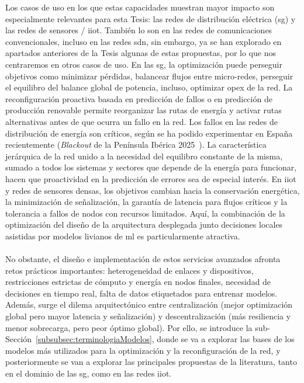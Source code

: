 Los casos de uso en los que estas capacidades muestran mayor impacto son especialmente relevantes para esta Tesis: las redes de distribución eléctrica (\gls{sg}) y las redes de sensores / \gls{iiot}. También lo son en las redes de comunicaciones convencionales, incluso en las redes \gls{sdn}, sin embargo, ya se han explorado en apartados anteriores de la Tesis algunas de estas propuestas, por lo que nos centraremos en otros casos de uso. En las \gls{sg}, la optimización puede perseguir objetivos como minimizar pérdidas, balancear flujos entre micro-redes, perseguir el equilibro del balance global de potencia, incluso, optimizar \gls{opex} de la red. La reconfiguración proactiva basada en predicción de fallos o en predicción de producción renovable permite reorganizar las rutas de energía y activar rutas alternativas antes de que ocurra un fallo en la red. Los fallos en las redes de distribución de energía son críticos, según se ha podido experimentar en España recientemente (\textit{Blackout} de la Península Ibérica 2025~\cite{iberianblackout}). La característica jerárquica de la red unido a la necesidad del equilibro constante de la misma, sumado a todos los sistemas y sectores que depende de la energía para funcionar, hacen que proactividad en la predicción de errores sea de especial interés. En \gls{iiot} y redes de sensores densas, los objetivos cambian hacia la conservación energética, la minimización de señalización, la garantía de latencia para flujos críticos y la tolerancia a fallos de nodos con recursos limitados. Aquí, la combinación de la optimización del diseño de la arquitectura desplegada junto decisiones locales asistidas por modelos livianos de \gls{ml} es particularmente atractiva.\\
\\
No obstante, el diseño e implementación de estos servicios avanzados afronta retos prácticos importantes: heterogeneidad de enlaces y dispositivos, restricciones estrictas de cómputo y energía en nodos finales, necesidad de decisiones en tiempo real, falta de datos etiquetados para entrenar modelos. Además, surge el dilema arquitectónico entre centralización (mejor optimización global pero mayor latencia y señalización) y descentralización (más resiliencia y menor sobrecarga, pero peor óptimo global). Por ello, se introduce la sub-Sección~\ref{subsubsec:terminologiaModelos}, donde se va a explorar las bases de los modelos más utilizados para la optimización y la reconfiguración de la red, y posteriormente se van a explorar las principales propuestas de la literatura, tanto en el dominio de las \gls{sg}, como en las redes \gls{iiot}.

